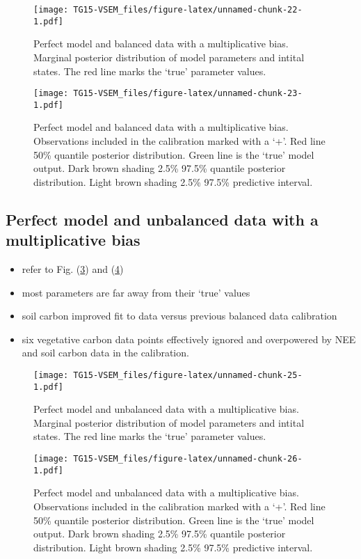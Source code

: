 \documentclass[]{article}
\providecommand{\tightlist}{%
  \setlength{\itemsep}{0pt}\setlength{\parskip}{0pt}}
\begin{document}
\begin{figure}
\centering
\texttt{[image: TG15-VSEM\_files/figure-latex/unnamed-chunk-22-1.pdf]}
\caption{\label{fig:perModbalDataBiasPar}Perfect model and balanced data
with a multiplicative bias. Marginal posterior distribution of model
parameters and intital states. The red line marks the `true' parameter
values.}
\end{figure}

\begin{figure}
\centering
\texttt{[image: TG15-VSEM\_files/figure-latex/unnamed-chunk-23-1.pdf]}
\caption{\label{fig:perModbalDataBiasOut}Perfect model and balanced data
with a multiplicative bias. Observations included in the calibration
marked with a `+'. Red line 50\% quantile posterior distribution. Green
line is the `true' model output. Dark brown shading 2.5\% 97.5\%
quantile posterior distribution. Light brown shading 2.5\% 97.5\%
predictive interval.}
\end{figure}

\subsection{Perfect model and unbalanced data with a multiplicative
bias}\label{perfect-model-and-unbalanced-data-with-a-multiplicative-bias}

\begin{itemize}
\tightlist
\item
  refer to Fig. (\ref{fig:perModunbalDataBiasPar}) and
  (\ref{fig:perModunbalDataBiasOut})
\item
  most parameters are far away from their `true' values
\item
  soil carbon improved fit to data versus previous balanced data
  calibration
\item
  six vegetative carbon data points effectively ignored and overpowered
  by NEE and soil carbon data in the calibration.
\end{itemize}

\begin{figure}
\centering
\texttt{[image: TG15-VSEM\_files/figure-latex/unnamed-chunk-25-1.pdf]}
\caption{\label{fig:perModunbalDataBiasPar}Perfect model and unbalanced
data with a multiplicative bias. Marginal posterior distribution of
model parameters and intital states. The red line marks the `true'
parameter values.}
\end{figure}

\begin{figure}
\centering
\texttt{[image: TG15-VSEM\_files/figure-latex/unnamed-chunk-26-1.pdf]}
\caption{\label{fig:perModunbalDataBiasOut}Perfect model and unbalanced
data with a multiplicative bias. Observations included in the
calibration marked with a `+'. Red line 50\% quantile posterior
distribution. Green line is the `true' model output. Dark brown shading
2.5\% 97.5\% quantile posterior distribution. Light brown shading 2.5\%
97.5\% predictive interval.}
\end{figure}
\end{document}
